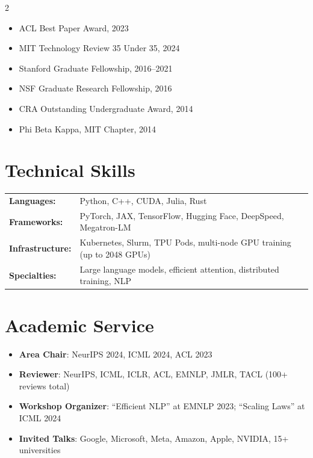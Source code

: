 \documentclass[11pt,a4paper]{article}
\begin{document}
\begin{multicols}{2}
\begin{itemize}[leftmargin=1.5em, nosep, itemsep=3pt]
  \item ACL Best Paper Award, 2023
  \item MIT Technology Review 35 Under 35, 2024
  \item Stanford Graduate Fellowship, 2016--2021
  \item NSF Graduate Research Fellowship, 2016
  \item CRA Outstanding Undergraduate Award, 2014
  \item Phi Beta Kappa, MIT Chapter, 2014
\end{itemize}
\end{multicols}

\section{Technical Skills}

\begin{tabularx}{\textwidth}{@{}lX@{}}
\textbf{Languages:} & Python, C++, CUDA, Julia, Rust \\
\textbf{Frameworks:} & PyTorch, JAX, TensorFlow, Hugging Face, DeepSpeed, Megatron-LM \\
\textbf{Infrastructure:} & Kubernetes, Slurm, TPU Pods, multi-node GPU training (up to 2048 GPUs) \\
\textbf{Specialties:} & Large language models, efficient attention, distributed training, NLP \\
\end{tabularx}

\section{Academic Service}

\begin{itemize}[leftmargin=1.5em, nosep, itemsep=3pt]
  \item \textbf{Area Chair}: NeurIPS 2024, ICML 2024, ACL 2023
  \item \textbf{Reviewer}: NeurIPS, ICML, ICLR, ACL, EMNLP, JMLR, TACL (100+ reviews total)
  \item \textbf{Workshop Organizer}: ``Efficient NLP'' at EMNLP 2023; ``Scaling Laws'' at ICML 2024
  \item \textbf{Invited Talks}: Google, Microsoft, Meta, Amazon, Apple, NVIDIA, 15+ universities
\end{itemize}
\end{document}
